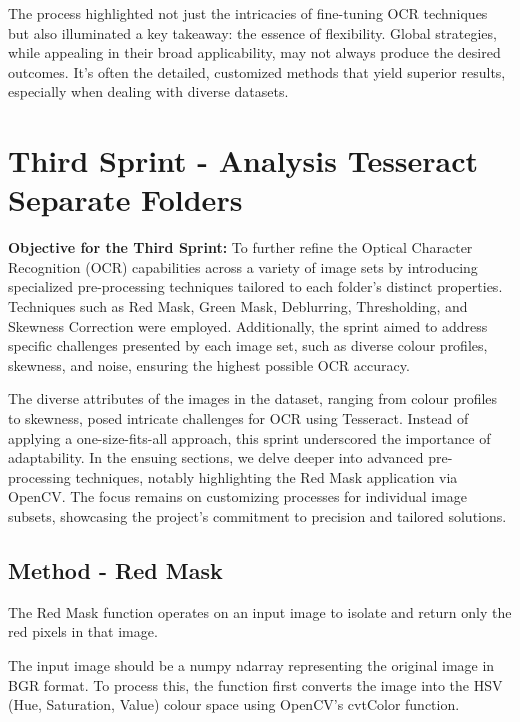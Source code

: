 The process highlighted not just the intricacies of fine-tuning OCR techniques but also illuminated a key takeaway: the essence of flexibility. Global strategies, while appealing in their broad applicability, may not always produce the desired outcomes. It's often the detailed, customized methods that yield superior results, especially when dealing with diverse datasets.

\newpage

\section{Third Sprint - Analysis Tesseract Separate Folders}

\textbf{Objective for the Third Sprint:} To further refine the Optical Character Recognition (OCR) capabilities across a variety of image sets by introducing specialized pre-processing techniques tailored to each folder's distinct properties. Techniques such as Red Mask, Green Mask, Deblurring, Thresholding, and Skewness Correction were employed. Additionally, the sprint aimed to address specific challenges presented by each image set, such as diverse colour profiles, skewness, and noise, ensuring the highest possible OCR accuracy.

The diverse attributes of the images in the dataset, ranging from colour profiles to skewness, posed intricate challenges for OCR using Tesseract. Instead of applying a one-size-fits-all approach, this sprint underscored the importance of adaptability. In the ensuing sections, we delve deeper into advanced pre-processing techniques, notably highlighting the Red Mask application via OpenCV. The focus remains on customizing processes for individual image subsets, showcasing the project's commitment to precision and tailored solutions.


\subsection*{Method - Red Mask}

The Red Mask function operates on an input image to isolate and return only the red pixels in that image.

The input image should be a numpy ndarray representing the original image in BGR format. To process this, the function first converts the image into the HSV (Hue, Saturation, Value) colour space using OpenCV's cvtColor function.

